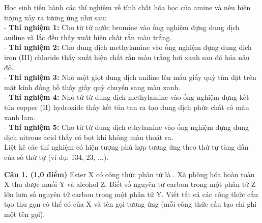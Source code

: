 \documentclass[11pt,a4paper]{article}
\begin{document}
\begin{ex}
Học sinh tiến hành các thí nghiệm về tính chất hóa học của amine và nêu hiện tượng xảy ra tương ứng như sau:\\
- \textbf{Thí nghiệm 1:} Cho từ từ nước bromine vào ống nghiệm đựng dung dịch aniline và lắc đều thấy xuất hiện chất rắn màu trắng.\\
- \textbf{Thí nghiệm 2:} Cho dung dịch methylamine vào ống nghiệm đựng dung dịch iron (III) chloride thấy xuất hiện chất rắn màu trắng hơi xanh sau đó hóa nâu đỏ.\\
- \textbf{Thí nghiệm 3:} Nhỏ một giọt dung dịch aniline lên mẩu giấy quỳ tím đặt trên mặt kính đồng hồ thấy giấy quỳ chuyển sang màu xanh.\\
- \textbf{Thí nghiệm 4:} Nhỏ từ từ dung dịch methylamine vào ống nghiệm đựng kết tủa copper (II) hydroxide thấy kết tủa tan ra tạo dung dịch phức chất có màu xanh lam.\\
- \textbf{Thí nghiệm 5:} Cho từ từ dung dịch ethylamine vào ống nghiệm đựng dung dịch nitrous acid thấy có bọt khí không màu thoát ra.\\
Liệt kê các thí nghiệm có hiện tượng phù hợp tương ứng theo thứ tự tăng dần của số thứ tự (ví dụ: 134, 23, ...).
\end{ex}

\vspace{6pt}
\vspace{4pt}

\noindent\textbf{Câu 1. (1,0 điểm)} Ester X có công thức phân tử là . Xà phòng hóa hoàn toàn X thu được muối Y và alcohol Z. Biết số nguyên tử carbon trong một phân tử Z lớn hơn số nguyên tử carbon trong một phân tử Y. Viết tất cả các công thức cấu tạo thu gọn có thể có của X và tên gọi tương ứng (mỗi công thức cấu tạo chỉ ghi một tên gọi).
\end{document}

